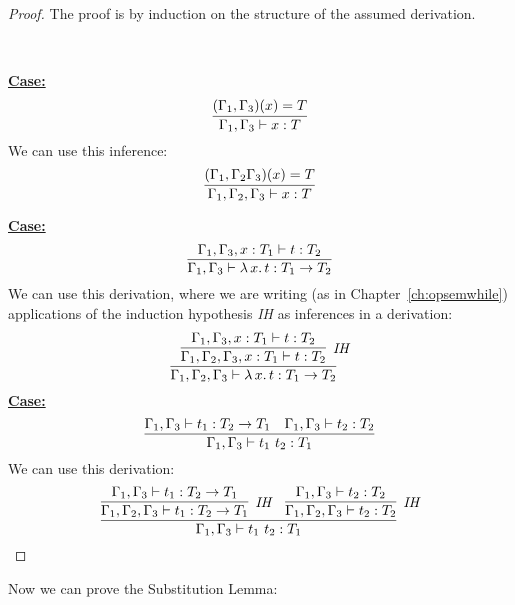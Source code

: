 \documentclass{article}
\begin{document}
\begin{proof}
The proof is by induction on the structure of the assumed derivation.

\ 

\noindent\underline{\textbf{Case:}}
\[
\infer{\Gamma_1,\Gamma_3\vdash x : T}{(\Gamma_1,\Gamma_3)(x) = T} 
\]
\noindent We can use this inference:
\[
\infer{\Gamma_1,\Gamma_2,\Gamma_3\vdash x : T}{(\Gamma_1,\Gamma_2\Gamma_3)(x) = T} 
\]

\noindent\underline{\textbf{Case:}}
\[
\infer{\Gamma_1,\Gamma_3\vdash \lambda\,x.\,t : T_1 \to T_2}
      {\Gamma_1,\Gamma_3,x:T_1\vdash t:T_2}
\]
\noindent We can use this derivation, where we are writing (as in Chapter~\ref{ch:opsemwhile})
applications of the induction hypothesis \textit{IH} as inferences in a derivation:
\[
\infer{\Gamma_1,\Gamma_2,\Gamma_3\vdash \lambda\,x.\,t : T_1 \to T_2}
      {\infer[\textit{IH}]{\Gamma_1,\Gamma_2,\Gamma_3,x:T_1\vdash t:T_2}{\Gamma_1,\Gamma_3,x:T_1\vdash t:T_2}}
\]
\noindent\underline{\textbf{Case:}}
\[
\infer{\Gamma_1,\Gamma_3\vdash t_1\ t_2 : T_1}
      {\Gamma_1,\Gamma_3\vdash t_1 : T_2 \to T_1 &
       \Gamma_1,\Gamma_3\vdash t_2 : T_2}
\]
\noindent We can use this derivation:
\[
\infer{\Gamma_1,\Gamma_3\vdash t_1\ t_2 : T_1}
      {\infer[\textit{IH}]{\Gamma_1,\Gamma_2,\Gamma_3\vdash t_1 : T_2 \to T_1}{\Gamma_1,\Gamma_3\vdash t_1 : T_2 \to T_1} &
       \infer[\textit{IH}]{\Gamma_1,\Gamma_2,\Gamma_3\vdash t_2 : T_2}{\Gamma_1,\Gamma_3\vdash t_2 : T_2}}
\]
\end{proof}

\noindent Now we can prove the Substitution Lemma:
\end{document}
